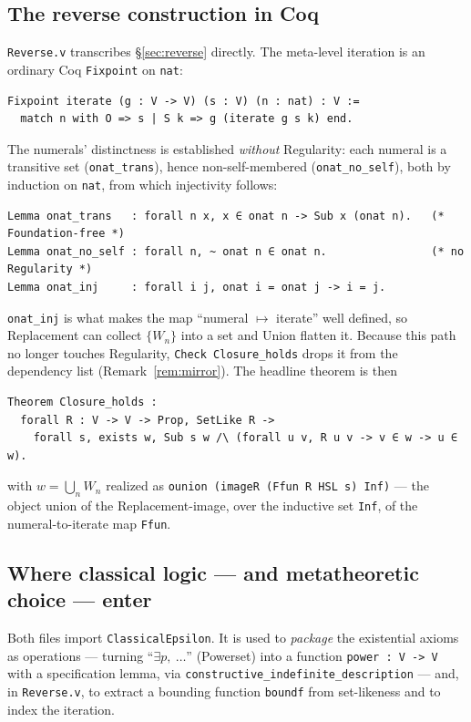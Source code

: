 \documentclass[11pt]{article}
\theoremstyle{plain}
\theoremstyle{definition}
\newcommand{\cq}[1]{\lstinline[basicstyle=\ttfamily]|#1|}
\begin{document}
\subsection{The reverse construction in Coq}

\texttt{Reverse.v} transcribes \S\ref{sec:reverse} directly. The meta-level
iteration is an ordinary Coq \cq{Fixpoint} on \cq{nat}:

\begin{lstlisting}
Fixpoint iterate (g : V -> V) (s : V) (n : nat) : V :=
  match n with O => s | S k => g (iterate g s k) end.
\end{lstlisting}

The numerals' distinctness is established \emph{without} Regularity: each numeral is
a transitive set (\cq{onat_trans}), hence non-self-membered (\cq{onat_no_self}), both
by induction on \cq{nat}, from which injectivity follows:

\begin{lstlisting}
Lemma onat_trans   : forall n x, x ∈ onat n -> Sub x (onat n).   (* Foundation-free *)
Lemma onat_no_self : forall n, ~ onat n ∈ onat n.                (* no Regularity *)
Lemma onat_inj     : forall i j, onat i = onat j -> i = j.
\end{lstlisting}

\cq{onat_inj} is what makes the map ``numeral $\mapsto$ iterate'' well defined, so
Replacement can collect $\{W_n\}$ into a set and Union flatten it. Because this path
no longer touches Regularity, \cq{Check Closure_holds} drops it from the dependency
list (Remark~\ref{rem:mirror}). The headline theorem is then

\begin{lstlisting}
Theorem Closure_holds :
  forall R : V -> V -> Prop, SetLike R ->
    forall s, exists w, Sub s w /\ (forall u v, R u v -> v ∈ w -> u ∈ w).
\end{lstlisting}

with $w = \bigcup_n W_n$ realized as \cq{ounion (imageR (Ffun R HSL s) Inf)} ---
the object union of the Replacement-image, over the inductive set \cq{Inf}, of the
numeral-to-iterate map \cq{Ffun}.

\subsection{Where classical logic --- and metatheoretic choice --- enter}

Both files import \cq{ClassicalEpsilon}. It is used to \emph{package} the
existential axioms as operations --- turning ``$\exists p,\ \dots$'' (Powerset)
into a function \cq{power : V -> V} with a specification lemma, via
\cq{constructive_indefinite_description} --- and, in \texttt{Reverse.v}, to extract
a bounding function \cq{boundf} from set-likeness and to index the iteration.
\end{document}
